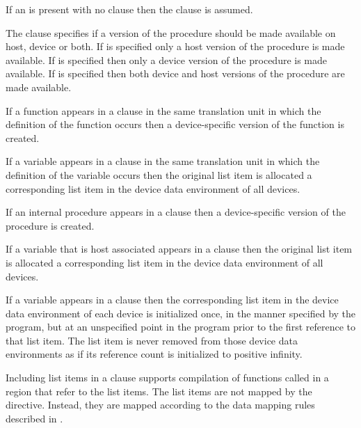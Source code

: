 If an  is present with no clause then the 
clause is assumed.

The  clause specifies if a version of the procedure should be made
available on host, device or both. If  is specified only a host version
of the procedure is made available.  If  is specified then only a device
version of the procedure is made available.  If  is specified then both
device and host versions of the procedure are made available.

\begin{ccppspecific}
If a function appears in a  clause in the same translation unit in which 
the definition of the function occurs then a device-specific version of the function 
is created.

If a variable appears in a  clause in the same translation unit in which 
the definition of the variable occurs then the original list item is allocated a 
corresponding list item in the device data environment of all devices.

\end{ccppspecific}

\begin{fortranspecific}
If an internal procedure appears in a  clause
then a device-specific version of the procedure is created.

If a variable that is host associated appears in a  clause
then the original list item is allocated a corresponding list item in the
device data environment of all devices.

\end{fortranspecific}

If a variable appears in a  clause then the corresponding list
item in the device data environment of each device is initialized once, in the
manner specified by the program, but at an unspecified point in the program
prior to the first reference to that list item.  The list item is never removed
from those device data environments as if its reference count is initialized to
positive infinity.

Including list items in a  clause supports compilation of
functions called in a  region that refer to the list
items.  The list items are not mapped by the ~
directive.  Instead, they are mapped according to the data mapping
rules described in 
.

